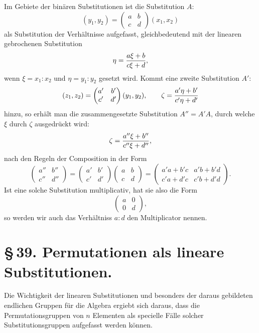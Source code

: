 \documentclass[11pt]{article}
\begin{document}
Im Gebiete der binären Substitutionen ist die Substitution $A$:
\[
(y_1,y_2)=\begin{pmatrix}a&b\\ c&d\end{pmatrix}(x_1,x_2)
\]
als Substitution der Verhältnisse aufgefasst, gleichbedeutend mit der linearen gebrochenen Substitution
\[
\eta={a\xi+b\over c\xi+d},
\]
wenn $\xi=x_1:x_2$ und $\eta=y_1:y_2$ gesetzt wird. Kommt eine zweite Substitution $A'$:
\[
(z_1,z_2)=\begin{pmatrix}a'&b'\\ c'&d'\end{pmatrix}(y_1,y_2),
\qquad
\zeta={a'\eta+b'\over c'\eta+d'}
\]
hinzu, so erhält man die zusammengesetzte Substitution $A''=A'A$, durch welche $\xi$ durch $\zeta$ ausgedrückt wird:
\[
\zeta={a''\xi+b''\over c''\xi+d''},
\]
nach den Regeln der Composition in der Form
\[
\begin{pmatrix}a''&b''\\c''&d''\end{pmatrix}
=\begin{pmatrix}a'&b'\\c'&d'\end{pmatrix}
\begin{pmatrix}a&b\\c&d\end{pmatrix}
=\begin{pmatrix}a'a+b'c&a'b+b'd\\c'a+d'c&c'b+d'd\end{pmatrix}.
\]
Ist eine solche Substitution multiplicativ, hat sie also die Form
\[
\begin{pmatrix}a&0\\0&d\end{pmatrix},
\]
so werden wir auch das Verhältniss $a:d$ den Multiplicator nennen.

\section*{\S\,39. Permutationen als lineare Substitutionen.}

Die Wichtigkeit der linearen Substitutionen und besonders der daraus gebildeten endlichen Gruppen für die Algebra ergiebt sich daraus, dass die Permutationsgruppen von $n$ Elementen als specielle Fälle solcher Substitutionsgruppen aufgefasst werden können.
\end{document}
